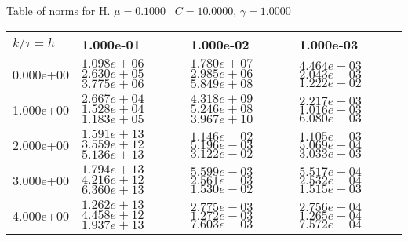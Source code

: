 \begin{center}
Table of norms for H. $\mu = 0.1000$ \, $C = 10.0000$, $\gamma = 1.0000$
  
\begin{tabular}{|p{1in}|p{1in}|p{1in}|p{1in}|} \hline
$k / \tau = h$ &1.000e-01 &1.000e-02 &1.000e-03 \\ \hline 
0.000e+00 & $1.098e+06$  $2.630e+05$  $3.775e+06$  & $1.780e+07$  $2.985e+06$  $5.849e+08$  & $4.464e-03$  $2.043e-03$  $1.222e-02$  \\ \hline 
1.000e+00 & $2.667e+04$  $1.528e+04$  $1.183e+05$  & $4.318e+09$  $5.246e+08$  $3.967e+10$  & $2.217e-03$  $1.016e-03$  $6.080e-03$  \\ \hline 
2.000e+00 & $1.591e+13$  $3.559e+12$  $5.136e+13$  & $1.146e-02$  $5.196e-03$  $3.122e-02$  & $1.105e-03$  $5.069e-04$  $3.033e-03$  \\ \hline 
3.000e+00 & $1.794e+13$  $4.216e+12$  $6.360e+13$  & $5.599e-03$  $2.561e-03$  $1.530e-02$  & $5.517e-04$  $2.532e-04$  $1.515e-03$  \\ \hline 
4.000e+00 & $1.262e+13$  $4.458e+12$  $1.937e+13$  & $2.775e-03$  $1.272e-03$  $7.603e-03$  & $2.756e-04$  $1.265e-04$  $7.572e-04$  \\ \hline 

\end{tabular}\\[20pt]
\end{center}
